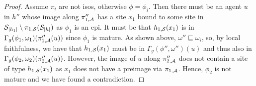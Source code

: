 \documentclass[a4paper,12pt]{article}
\newcommand{\anon}[1]{\left|#1\right|}
\newcommand{\gp}{\Gamma}
\begin{document}
\begin{proof}
  Assume $\pi_i$ are not isos,
  otherwise $\phi = \phi_i$.
  Then there must be an agent $u$ in $h''$
  whose image along $\pi_{1,\mathcal{A}}''$
  has a site $x_1$ bound to some site in
  $\sites_{\anon{h_1}} \setminus \pi_{1,\sites}(\sites_{\anon{h}})$
  as $\phi_1$ is an epi.
  It must be that $h_{1,\mathcal{S}}(x_1)$ is in
  $\gp_g(\phi_1,\omega_1)(\pi_{1,\agents}''(u))$
  since $\phi_1$ is mature.
  As shown above, $\omega'' \sqsubseteq \omega_i$,
  so, by local faithfulness, we have that
  $h_{1,\mathcal{S}}(x_1)$ must be in $\gp_g(\phi'',\omega'')(u)$
  and thus also in $\gp_g(\phi_2,\omega_2)(\pi_{2,\agents}''(u))$.
  However,
  the image of $u$ along $\pi_{2,\mathcal{A}}''$ does not contain
  a site of type $h_{1,\mathcal{S}}(x_1)$
  as $x_1$ does not have a preimage via $\pi_{1,\mathcal{A}}$.
  Hence, $\phi_2$ is not mature
  and we have found a contradiction.
\end{proof}

\pagebreak
\end{document}
